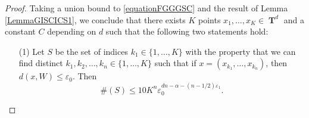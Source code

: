 \documentclass[12pt,reqno]{article}
\numberwithin{equation}{section}
\DeclareMathOperator{\TT}{\mathbf{T}}
\DeclareMathOperator{\PP}{\mathbf{P}}
\begin{document}
\begin{proof}
    Taking a union bound to \eqref{equationFGGGSC} %
    and the result of Lemma \ref{LemmaGISCICS1}, we conclude that there exists $K$ points $x_1, \dots, x_K \in \TT^d$ and a constant $C$ depending on $d$ such that the following two statements hold:
    \begin{itemize}
        \item[(1)] Let $S$ be the set of indices $k_1 \in \{ 1, \dots, K \}$ with the property that we can find distinct $k_1, k_2, \dots, k_n \in \{ 1, \dots, K \}$ such that if $x = (x_{k_1}, \dots, x_{k_n})$, then $d(x, W) \leq \varepsilon_0$. Then
        \begin{equation} \label{equationGGSC99124}
            \#(S) \leq 10 K^n \varepsilon_0^{dn-\alpha-(n-1/2) \varepsilon_1}.
        \end{equation}


\end{itemize}
\end{proof}
\end{document}
